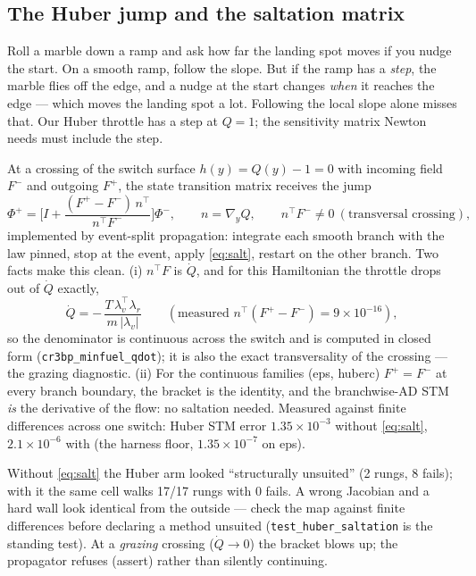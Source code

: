 \documentclass[11pt]{article}
\newcommand{\lv}{\lambda_v}\newcommand{\lr}{\lambda_r}\newcommand{\lm}{\lambda_m}
\newcommand{\file}[1]{\texttt{#1}}
\begin{document}
\subsection{The Huber jump and the saltation matrix}\label{sec:saltation}
\begin{eli}
Roll a marble down a ramp and ask how far the landing spot moves if you nudge
the start. On a smooth ramp, follow the slope. But if the ramp has a
\emph{step}, the marble flies off the edge, and a nudge at the start changes
\emph{when} it reaches the edge --- which moves the landing spot a lot.
Following the local slope alone misses that. Our Huber throttle has a step at
$Q=1$; the sensitivity matrix Newton needs must include the step.
\end{eli}
\begin{rig}
At a crossing of the switch surface $h(y)=Q(y)-1=0$ with incoming field $F^-$
and outgoing $F^+$, the state transition matrix receives the jump
\begin{equation}\label{eq:salt}
\Phi^+=\Big[I+\frac{(F^+-F^-)\,n^{\!\top}}{n^{\!\top}F^-}\Big]\Phi^-,\qquad n=\nabla_y Q,\qquad n^{\!\top}F^-\neq0\ (\text{transversal crossing}),
\end{equation}
implemented by event-split propagation: integrate each smooth branch with the
law pinned, stop at the event, apply \eqref{eq:salt}, restart on the other
branch. Two facts make this clean. (i) $n^{\!\top}F$ is $\dot Q$, and for this
Hamiltonian the throttle drops out of $\dot Q$ exactly,
\[
\dot Q=-\,\frac{T\,\lv^{\!\top}\lr}{m\,|\lv|}\qquad(\text{measured } n^{\!\top}(F^+-F^-)=9\times10^{-16}),
\]
so the denominator is continuous across the switch and is computed in closed
form (\file{cr3bp\_minfuel\_qdot}); it is also the exact transversality of the
crossing --- the grazing diagnostic. (ii) For the continuous families (eps,
huberc) $F^+=F^-$ at every branch boundary, the bracket is the identity, and
the branchwise-AD STM \emph{is} the derivative of the flow: no saltation needed.
Measured against finite differences across one switch: Huber STM error
$1.35\times10^{-3}$ without \eqref{eq:salt}, $2.1\times10^{-6}$ with (the harness
floor, $1.35\times10^{-7}$ on eps).
\end{rig}
\begin{warn}
Without \eqref{eq:salt} the Huber arm looked ``structurally unsuited'' (2 rungs,
8 fails); with it the same cell walks 17/17 rungs with 0 fails. A wrong Jacobian
and a hard wall look identical from the outside --- check the map against
finite differences before declaring a method unsuited (\file{test\_huber\_saltation}
is the standing test). At a \emph{grazing} crossing ($\dot Q\to0$) the bracket
blows up; the propagator refuses (assert) rather than silently continuing.
\end{warn}
\end{document}
